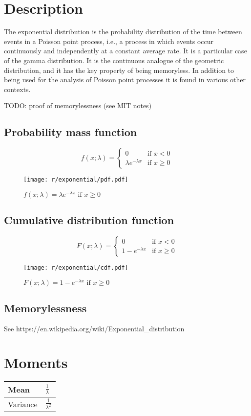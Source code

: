 \section{Description}
The exponential distribution is the probability distribution of the time between events in a Poisson point process, i.e., a process in which events occur continuously and independently at a constant average rate. It is a particular case of the gamma distribution. It is the continuous analogue of the geometric distribution, and it has the key property of being memoryless. In addition to being used for the analysis of Poisson point processes it is found in various other contexts.

TODO: proof of memorylessness (see MIT notes)

\subsection{Probability mass function}
\[
	f(x; \lambda) =
	\begin{cases}
		0 & \text{if } x < 0 \\
		\lambda e^{-\lambda x} & \text{if } x \geq 0
	\end{cases}
\]

\begin{figure}[H]
	\texttt{[image: r/exponential/pdf.pdf]}
	\caption{$f(x; \lambda) = \lambda e^{-\lambda x} \text{ if } x \geq 0$}
\end{figure}

\subsection{Cumulative distribution function}
\[
	F(x; \lambda) =
	\begin{cases}
		0 & \text{if } x < 0 \\
		1 - e^{-\lambda x} & \text{if } x \geq 0
	\end{cases}
\]

\begin{figure}[H]
	\texttt{[image: r/exponential/cdf.pdf]}
	\caption{$F(x; \lambda) = 1 - e^{-\lambda x} \text{ if } x \geq 0$}
\end{figure}

\subsection{Memorylessness}
See https://en.wikipedia.org/wiki/Exponential\_distribution

\section{Moments}

\begin{tabularx}{\textwidth}{s X}
	\hline
	Mean & $\frac{1}{\lambda}$ \\\hline
	Variance & $\frac{1}{\lambda ^2}$\\\hline
\end{tabularx}


